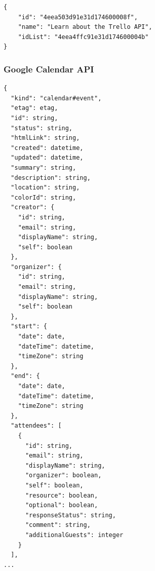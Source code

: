 \documentclass{article}
\begin{document}
	\begin{lstlisting}[label=trello,caption=Trello API Example,breaklines=true]
{
    "id": "4eea503d91e31d174600008f",
    "name": "Learn about the Trello API",
    "idList": "4eea4ffc91e31d174600004b"
}
	\end{lstlisting}

\subsubsection{Google Calendar API}
\begin{lstlisting}[label=calendar,caption=Google Calendar API Example, breaklines=true]
{
  "kind": "calendar#event",
  "etag": etag,
  "id": string,
  "status": string,
  "htmlLink": string,
  "created": datetime,
  "updated": datetime,
  "summary": string,
  "description": string,
  "location": string,
  "colorId": string,
  "creator": {
    "id": string,
    "email": string,
    "displayName": string,
    "self": boolean
  },
  "organizer": {
    "id": string,
    "email": string,
    "displayName": string,
    "self": boolean
  },
  "start": {
    "date": date,
    "dateTime": datetime,
    "timeZone": string
  },
  "end": {
    "date": date,
    "dateTime": datetime,
    "timeZone": string
  },
  "attendees": [
    {
      "id": string,
      "email": string,
      "displayName": string,
      "organizer": boolean,
      "self": boolean,
      "resource": boolean,
      "optional": boolean,
      "responseStatus": string,
      "comment": string,
      "additionalGuests": integer
    }
  ],
...
\end{lstlisting}
\end{document}
